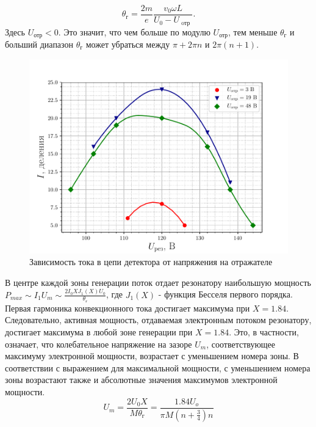   $$\theta _ { \text{г} } = \frac { 2 m } { e } \frac { v _ { 0 } \omega L } { U _ { 0 } - U _ { \text{ oтр } } }.$$ 
  Здесь $U_{\text{отр}}<0$. Это значит, что чем больше по модулю $U_{\text{отр}}$, тем меньше $\theta _ { \text{г} }$ и больший диапазон $\theta _ { \text{г} }$ может убраться между $\pi+ 2\pi n$ и $2\pi(n+1)$.

\begin{figure}[H]
		\centering
		\includegraphics[width=\linewidth]{fig/task3b}
		\caption{Зависимость тока в цепи детектора от напряжения на отражателе}
		\label{fig:task3b}
\end{figure}


В центре каждой зоны генерации поток отдает резонатору наибольшую мощность $\displaystyle P_{max}\sim I_1 U_m \sim \frac{2I_0 XJ_1(X) U_0}{\theta _ { \text{г} }}$, где $J_1(X)$ - функция Бесселя первого порядка. Первая гармоника конвекционного тока достигает максимума при $X=1.84$. Следовательно, активная мощность, отдаваемая электронным потоком резонатору, достигает максимума в любой зоне генерации при $X=1.84$. Это, в частности, означает, что колебательное напряжение на зазоре $U_m$, соответствующее максимуму электронной мощности, возрастает с уменьшением номера зоны. В соответствии с выражением для максимальной мощности, с уменьшением номера зоны возрастают также и абсолютные значения максимумов электронной мощности. $$U_m=\frac{2U_0X}{M\theta _ { \text{г} }}=\frac{1.84 U_o}{\pi M(n+\frac 34)n}$$


